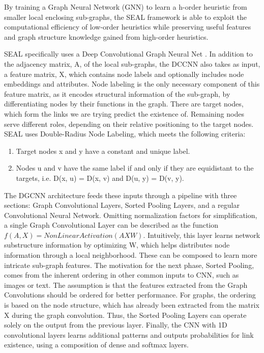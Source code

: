 \documentclass[10pt,twocolumn,letterpaper]{article}
\begin{document}
By training a Graph Neural Network (GNN) to learn a h-order heuristic from smaller local enclosing sub-graphs, the SEAL framework\cite{SEAL} is able to exploit the computational efficiency of low-order heuristics while preserving useful features and graph structure knowledge gained from high-order heuristics.

SEAL specifically uses a Deep Convolutional Graph Neural Net \cite{DGCNN}. In addition to the adjacency matrix, A, of the local sub-graphs, the DCCNN also takes as input, a feature matrix, X, which contains node labels and optionally includes node embeddings and attributes. 
Node labeling is the only necessary component of this feature matrix, as it encodes structural information of the sub-graph, by differentiating nodes by their functions in the graph. There are target nodes, which form the links we are trying predict the existence of. Remaining nodes serve different roles, depending on their relative positioning to the target nodes. SEAL uses Double-Radius Node Labeling, which meets the following criteria:

\begin{enumerate}
    \item Target nodes x and y have a constant and unique label. 
    \item Nodes u and v have the same label if and only if they are equidistant to the targets, i.e. D(x, u) = D(x, v) and D(u, y) = D(v, y).
\end{enumerate}

The DGCNN architecture feeds these inputs through a pipeline with three sections: Graph Convolutional Layers, Sorted Pooling Layers, and a regular Convolutional Neural Network. Omitting normalization factors for simplification, a single Graph Convolutional Layer can be described as the function $f(A, X) = NonLinearActivation(AXW)$. Intuitively, this layer learns network substructure information by optimizing W, which helps distributes node information through a local neighborhood. These can be composed to learn more intricate sub-graph features. The motivation for the next phase, Sorted Pooling, comes from the inherent ordering in other common inputs to CNN, such as images or text. The assumption is that the features extracted from the Graph Convolutions should be ordered for better performance. For graphs, the ordering is based on the node structure, which has already been extracted from the matrix X during the graph convolution. Thus, the Sorted Pooling Layers can operate solely on the output from the previous layer. Finally, the CNN with 1D convolutional layers learns additional patterns and outputs probabilities for link existence, using a composition of dense and softmax layers.
\end{document}
